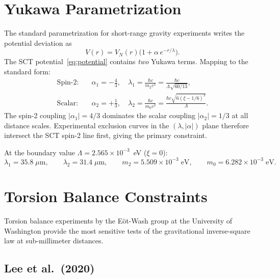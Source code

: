 \documentclass[11pt,a4paper]{article}
\begin{document}
\section{Yukawa Parametrization}
\label{sec:yukawa}

The standard parametrization for short-range gravity experiments writes the
potential deviation as
\begin{equation}
  V(r) = V_N(r)\bigl(1 + \alpha\,e^{-r/\lambda}\bigr).
  \label{eq:yukawa-standard}
\end{equation}
The SCT potential~\eqref{eq:potential} contains \emph{two} Yukawa terms.
Mapping to the standard form:
\begin{align}
  \text{Spin-2:}&\quad \alpha_1 = -\frac{4}{3}, \quad
    \lambda_1 = \frac{\hbar c}{m_2 c^2}
    = \frac{\hbar c}{\Lambda\sqrt{60/13}}, \label{eq:lambda1}\\[4pt]
  \text{Scalar:}&\quad \alpha_2 = +\frac{1}{3}, \quad
    \lambda_2 = \frac{\hbar c}{m_0 c^2}
    = \frac{\hbar c\sqrt{6(\xi-1/6)^2}}{\Lambda}. \label{eq:lambda2}
\end{align}
The spin-2 coupling $|\alpha_1| = 4/3$ dominates the scalar coupling
$|\alpha_2| = 1/3$ at all distance scales. Experimental exclusion curves
in the $(\lambda, |\alpha|)$ plane therefore intersect the SCT spin-2 line
first, giving the primary constraint.

At the boundary value $\Lambda = 2.565 \times 10^{-3}$~eV ($\xi = 0$):
\begin{equation}
  \lambda_1 = 35.8\;\mu\text{m}, \qquad
  \lambda_2 = 31.4\;\mu\text{m}, \qquad
  m_2 = 5.509 \times 10^{-3}\;\text{eV}, \qquad
  m_0 = 6.282 \times 10^{-3}\;\text{eV}.
\end{equation}

\section{Torsion Balance Constraints}
\label{sec:eotwash}

Torsion balance experiments by the E\"ot-Wash group at the University of
Washington provide the most sensitive tests of the gravitational inverse-square
law at sub-millimeter distances.

\subsection{Lee et al.\ (2020)}
\end{document}
